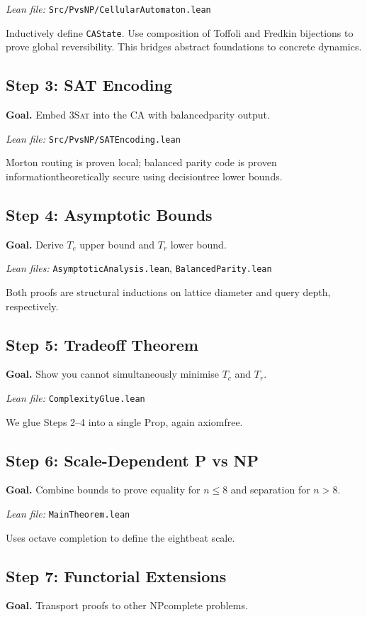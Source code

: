 \documentclass[11pt]{article}
\theoremstyle{plain}
\theoremstyle{definition}
\theoremstyle{remark}
\begin{document}
\emph{Lean file:} \texttt{Src/PvsNP/CellularAutomaton.lean}

Inductively define \texttt{CAState}.  Use composition of Toffoli and Fredkin bijections to prove global reversibility.  This bridges abstract foundations to concrete dynamics.

\subsection*{Step 3: SAT Encoding}
\textbf{Goal.}  Embed \textsc{3Sat} into the CA with balanced\textendash parity output.

\emph{Lean file:} \texttt{Src/PvsNP/SATEncoding.lean}

Morton routing is proven local; balanced parity code is proven information\textendash theoretically secure using decision\textendash tree lower bounds.

\subsection*{Step 4: Asymptotic Bounds}
\textbf{Goal.}  Derive $T_c$ upper bound and $T_r$ lower bound.

\emph{Lean files:} \texttt{AsymptoticAnalysis.lean}, \texttt{BalancedParity.lean}

Both proofs are structural inductions on lattice diameter and query depth, respectively.

\subsection*{Step 5: Tradeoff Theorem}
\textbf{Goal.}  Show you cannot simultaneously minimise $T_c$ and $T_r$.

\emph{Lean file:} \texttt{ComplexityGlue.lean}

We glue Steps 2–4 into a single Prop, again axiom\textendash free.

\subsection*{Step 6: Scale-Dependent P vs NP}
\textbf{Goal.}  Combine bounds to prove equality for $n\le8$ and separation for $n>8$.

\emph{Lean file:} \texttt{MainTheorem.lean}

Uses octave completion to define the eight\textendash beat scale.

\subsection*{Step 7: Functorial Extensions}
\textbf{Goal.}  Transport proofs to other NP\textendash complete problems.
\end{document}
